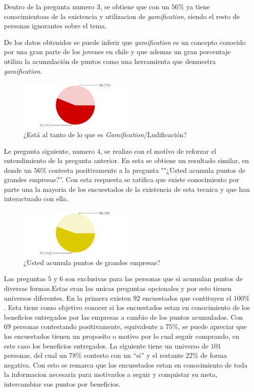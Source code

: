 Dentro de la pregunta numero 3, se obtiene que con un $56\%$ ya tiene conocimientoas de la existencia
y utilizacion de \emph{gamification}, siendo el resto de personas ignorantes sobre el tema. 

De los datos obtenidos se puede inferir que \emph{gamification} es un concepto conocido por una gran parte
de los jovenes en chile y que ademas un gran porcentaje utiliza la acumulación de puntos como una
herramienta que demuestra \emph{gamification}.

\begin{figure}[!htb]
  \centering
  \includegraphics[width=0.5\textwidth]{images/chartPreg3.png}
  \caption[chart3]{¿Está al tanto de lo que es \emph{Gamification}/Ludificación?}
  \label{fig:chart1}
\end{figure}

Le pregunta siguiente, numero $4$, se realizo con el motívo de reforzar el entendimiento de la pregunta 
anterior. En esta se obtiene un resultado similar, en donde un $56\%$ contesta positivamente a la 
pregunta ""¿Usted acumula puntos de grandes empresas?''. Con esta respuesta se ratifica que existe 
conocimiento por parte una la mayoria de los encuestados de la existencia de esta tecnica y que han 
interactuado con ella.

\begin{figure}[!htb]
  \centering
  \includegraphics[width=0.5\textwidth]{images/chartPreg4.png}
  \caption[chart4]{¿Usted acumula puntos de grandes empresas?}
  \label{fig:chart2}
\end{figure}

Las preguntas $5$ y $6$ son exclusivas para las personas que si acumulan puntos de diversas formas.Estas 
eran las unicas preguntas opcionales y por esto tienen universos diferentes. 
En la primera existen $92$ encuestados que contituyen el $100\%$. Esta tiene como objetivo conocer 
si los encuestados estan en conocimiento de los beneficios entregados por las empresas a cambio de
 los puntos acumulados. Con $69$ personas contestando positivamente, equivalente a $75\%$, se puede
apreciar que los encuestados tienen un proposito o motivo por lo cual seguir comprando, en este caso
los beneficios entregados.
La siguiente tiene un universo de $101$ personas, del cual un $78\%$ contesto con un ``si'' y el 
restante $22\%$ de forma negativa. Con esto se remarca que los encuestados estan en conocimiento
de toda la informacion necesaria para motivarlos a seguir y conquistar su meta, intercambiar sus 
puntos por beneficios.

